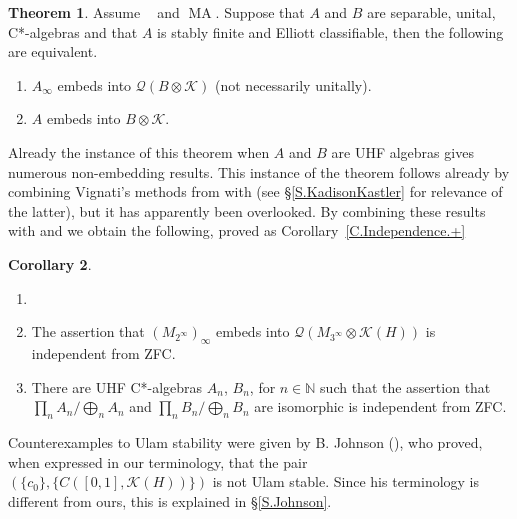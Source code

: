 \documentclass[11pt]{amsproc}
\newcommand{\bbN}{\mathbb N}
\newcommand{\cstar}{C*}
\newcommand{\cQ}{\mathcal Q}
\newcommand{\cK}{\mathcal K}
\DeclareMathOperator{\OCAT}{OCA_T}
\DeclareMathOperator{\MA}{MA}
\theoremstyle{definition}
\newtheorem{thm}{Theorem}
\newtheorem{coro}[thm]{Corollary}
\theoremstyle{plain}
\theoremstyle{remark}
\begin{document}
\begin{thm}\label{T.CoronaEmbedding} Assume $\OCAT$ and $\MA$. 
	Suppose that $A$ and $B$ are separable, unital, \cstar-algebras and that $A$ is stably finite and Elliott classifiable,  then the following are equivalent. 
	\begin{enumerate}
		\item $A_\infty$ embeds into $\cQ(B\otimes \cK)$ (not necessarily unitally). 
		\item $A$ embeds into $B\otimes \cK$. 
	\end{enumerate}
\end{thm}

Already the instance of this theorem when $A$ and $B$ are UHF algebras gives numerous non-embedding results. This instance of the theorem follows already by combining Vignati's methods from \cite{vignati2022rigidity} with \cite{CSSWW:Perturbations} (see \S\ref{S.KadisonKastler} for relevance of the latter), but it has apparently been overlooked. 
By combining these results with  \cite{ghasemi2014reduced} and \cite{farah2017calkin} we obtain the following, proved as Corollary~\ref{C.Independence.+}

\begin{coro}\label{C.Independence}
\begin{enumerate}
\item[]
\item The assertion that $(M_{2^\infty})_\infty$ embeds into $\cQ(M_{3^\infty}\otimes \cK(H))$ is independent from ZFC. 
\item 	There are UHF \cstar-algebras $A_n$, $B_n$, for $n\in \bbN$ such that the assertion that $\prod_n A_n/\bigoplus_n A_n$ and $\prod_n B_n/\bigoplus_n B_n$ are isomorphic is independent from ZFC. 
\end{enumerate}
\end{coro}

Counterexamples to Ulam stability were given by B. Johnson (\cite{johnson1982counterexample}), who proved, when expressed in our terminology, that the pair $(\{c_0\}, \{C([0,1],\cK(H))\})$ is not Ulam stable. Since his terminology is different from ours, this is explained in \S\ref{S.Johnson}. 
\end{document}
